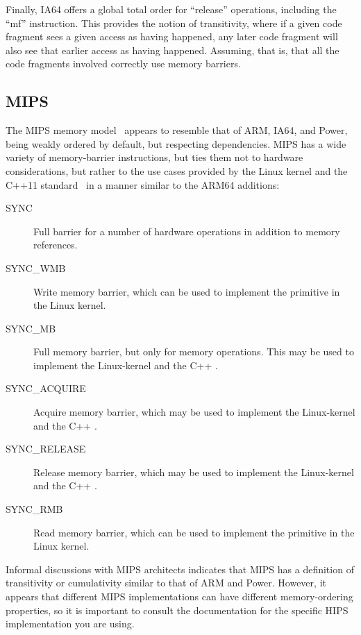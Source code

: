 Finally, IA64 offers a global total order for ``release'' operations,
including the ``mf'' instruction.
This provides the notion of transitivity, where if a given code fragment
sees a given access as having happened, any later code fragment will
also see that earlier access as having happened.
Assuming, that is, that all the code fragments involved correctly use
memory barriers.

\subsection{MIPS}

The MIPS memory model~\cite[Table 6.6]{MIPSvII-A-2015}
appears to resemble that of ARM, IA64, and Power,
being weakly ordered by default, but respecting dependencies.
MIPS has a wide variety of memory-barrier instructions, but ties them
not to hardware considerations, but rather to the use cases provided
by the Linux kernel and the C++11 standard~\cite{RichardSmith2015N4527}
in a manner similar to the ARM64 additions:

\begin{description}
\item[SYNC]
	Full barrier for a number of hardware operations in addition
	to memory references.
\item[SYNC\_WMB]
	Write memory barrier, which can be used to implement the
	 primitive in the Linux kernel.
\item[SYNC\_MB]
	Full memory barrier, but only for memory operations.
	This may be used to implement the Linux-kernel 
	and the C++ .
\item[SYNC\_ACQUIRE]
	Acquire memory barrier, which may be used to implement the
	Linux-kernel  and the C++
	.
\item[SYNC\_RELEASE]
	Release memory barrier, which may be used to implement the
	Linux-kernel  and the C++
	.
\item[SYNC\_RMB]
	Read memory barrier, which can be used to implement the
	 primitive in the Linux kernel.
\end{description}

Informal discussions with MIPS architects indicates that MIPS has a
definition of transitivity or cumulativity similar to that of
ARM and Power.
However, it appears that different MIPS implementations can have
different memory-ordering properties, so it is important to consult
the documentation for the specific HIPS implementation you are using.

